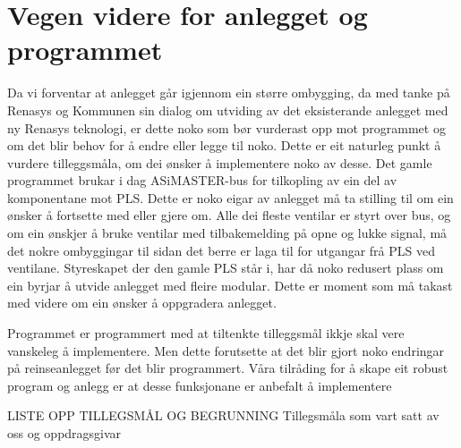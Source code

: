 \section{Vegen videre for anlegget og programmet}
\thispagestyle{fancy}


Da vi forventar at anlegget går igjennom ein større ombygging, da med tanke på Renasys og Kommunen sin dialog om utviding av det eksisterande anlegget med ny Renasys teknologi, er dette noko som bør vurderast opp mot programmet og om det blir behov for å endre eller legge til noko. 
Dette er eit naturleg punkt å vurdere tilleggsmåla, om dei ønsker å implementere noko av desse.
Det gamle programmet brukar i dag ASiMASTER-bus for tilkopling av ein del av komponentane mot PLS. 
Dette er noko eigar av anlegget må ta stilling til om ein ønsker å fortsette med eller gjere om. Alle dei fleste ventilar er styrt over bus, og om ein ønskjer å bruke ventilar med tilbakemelding på opne og lukke signal, må det nokre ombyggingar til sidan det berre er laga til for utgangar frå PLS ved ventilane.
Styreskapet der den gamle PLS står i, har då noko redusert plass om ein byrjar å utvide anlegget med fleire modular. 
Dette er moment som må takast med videre om ein ønsker å oppgradera anlegget. 

Programmet er programmert med at tiltenkte tilleggsmål ikkje skal vere vanskeleg å implementere. 
Men dette forutsette at det blir gjort noko endringar på reinseanlegget før det blir programmert. 
Våra tilråding for å skape eit robust program og anlegg er at desse funksjonane er anbefalt å implementere

LISTE OPP TILLEGSMÅL OG BEGRUNNING
Tillegsmåla som vart satt av oss og oppdragsgivar



\newline

